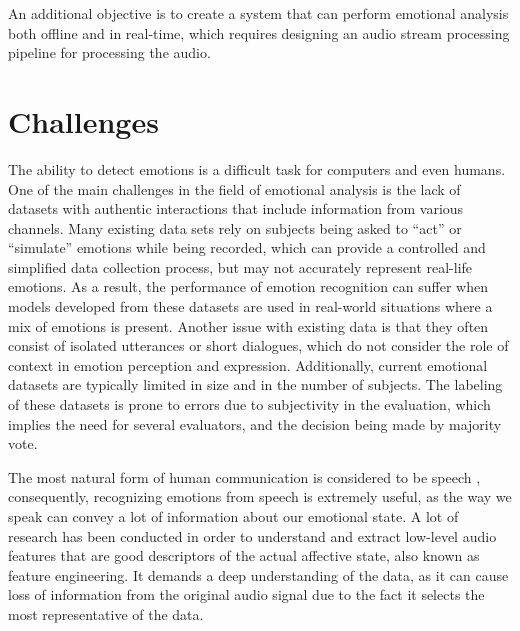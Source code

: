 An additional objective is to create a system that can perform emotional analysis both offline and in real-time, which requires designing an audio stream processing pipeline for processing the audio.


\section{Challenges}

The ability to detect emotions is a difficult task for computers and even humans. One of the main challenges in the field of emotional analysis is the lack of datasets with authentic interactions that include information from various channels. Many existing data sets rely on subjects being asked to “act” or “simulate” emotions while being recorded, which can provide a controlled and simplified data collection process, but may not accurately represent real-life emotions. As a result, the performance of emotion recognition can suffer when models developed from these datasets are used in real-world situations where a mix of emotions is present. Another issue with existing data is that they often consist of isolated utterances or short dialogues, which do not consider the role of context in emotion perception and expression. Additionally, current emotional datasets are typically limited in size and in the number of subjects. The labeling of these datasets is prone to errors due to subjectivity in the evaluation, which implies the need for several evaluators, and the decision being made by majority vote.

The most natural form of human communication is considered to be speech \cite{Deng2006}, consequently, recognizing emotions from speech is extremely useful, as the way we speak can convey a lot of information about our emotional state. A lot of research has been conducted in order to understand and extract low-level audio features that are good descriptors of the actual affective state, also known as feature engineering. It demands a deep understanding of the data, as it can cause loss of information from the original audio signal due to the fact it selects the most representative of the data.

